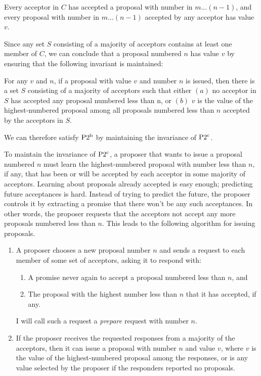 \begin{paxostheoremenv}
    Every acceptor in $C$ has accepted a proposal with number in $m\ldots(n-1)$, and every proposal with number in $m\ldots(n-1)$ accepted by any acceptor has value $v$.
\end{paxostheoremenv}

Since any set $S$ consisting of a majority of acceptors contains at least one member of $C$, we can conclude that a proposal numbered $n$ has value $v$ by ensuring that the following invariant is maintained:

\begin{paxostheoremenv}[$\PaxosSubtheorem{2}{c}$]
    For any $v$ and $n$, if a proposal with value $v$ and number $n$ is issued, then there is a set $S$ consisting of a majority of acceptors such that either $(a)$ no acceptor in $S$ has accepted any proposal numbered less than n, or $(b)$ $v$ is the value of the highest-numbered proposal among all proposals numbered less than $n$ accepted by the acceptors in $S$.
\end{paxostheoremenv}

We can therefore satisfy $\operatorname{P2^{b}}$ by maintaining the invariance of $\PaxosSubtheorem{2}{c}$.

To maintain the invariance of $\PaxosSubtheorem{2}{c}$, a proposer that wants to issue a proposal numbered $n$ must learn the highest-numbered proposal with number less than $n$, if any, that has been or will be accepted by each acceptor in some majority of acceptors.
Learning about proposals already accepted is easy enough; predicting future acceptances is hard.
Instead of trying to predict the future, the proposer controls it by extracting a promise that there won't be any such acceptances.
In other words, the proposer requests that the acceptors not accept any more proposals numbered less than $n$.
This leads to the following algorithm for issuing proposals.

\begin{enumerate}
    \item A proposer chooses a new proposal number $n$ and sends a request to each member of some set of acceptors, asking it to respond with:
    \begin{enumerate}
        \item A promise never again to accept a proposal numbered less than $n$, and
        \item The proposal with the highest number less than $n$ that it has accepted, if any.
    \end{enumerate}
    I will call such a request a \emph{prepare} request with number $n$.
    \item If the proposer receives the requested responses from a majority of the acceptors, then it can issue a proposal with number $n$ and value $v$, where $v$ is the value of the highest-numbered proposal among the responses, or is any value selected by the proposer if the responders reported no proposals.
\end{enumerate}

